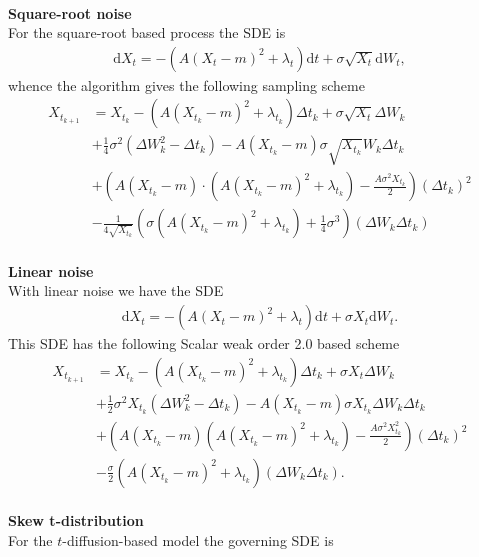 \\
\textbf{Square-root noise}\\
For the square-root based process the SDE is
\begin{align}
    \mathrm{d}X_t = -\left(A(X_t - m)^2 + \lambda_t\right)\mathrm{d}t + \sigma \sqrt{X_t}\mathrm{d}W_t,
\end{align}
whence the algorithm gives the following sampling scheme 
\begin{align}
    X_{t_{k + 1}} &= X_{t_k} - \left(A(X_{t_k} - m)^2 + \lambda_{t_k}\right) \Delta t_k + \sigma \sqrt{X_t} \Delta W_{k}\nonumber\\ &+ \frac{1}{4}\sigma^2 \left(\Delta W_k^2 - \Delta t_k\right)     - A\left(X_{t_k} - m\right)\sigma \sqrt{X_{t_k}} W_k \Delta t_k
    \nonumber\\
     &+ \left(A\left(X_{t_k} - m\right)\cdot \left(A\left(X_{t_k} - m\right)^2 + \lambda_{t_k}\right) - \frac{A\sigma^2 X_{t_k}}{2}\right)(\Delta t_k)^2 \nonumber\\
    &- \frac{1}{4\sqrt{X_{t_k}}}\left(\sigma\left(A\left(X_{t_k} - m\right)^2 + \lambda_{t_k}\right) + \frac{1}{4}\sigma^3\right) \left(\Delta W_k \Delta t_k\right)
\end{align}
\\
\textbf{Linear noise}\\
With linear noise we have the SDE
\begin{align}
    \mathrm{d}X_t = -\left(A(X_t - m)^2 + \lambda_t\right)\mathrm{d}t + \sigma X_t\mathrm{d}W_t.
\end{align}
This SDE has the following Scalar weak order 2.0 based scheme
\begin{align}
    X_{t_{k + 1}} &= X_{t_k} - \left(A(X_{t_k} - m)^2 + \lambda_{t_k}\right) \Delta t_k + \sigma X_t \Delta W_{k} \nonumber \\ &
    + \frac{1}{2}\sigma^2 X_{t_k}\left(\Delta W_{k}^2 - \Delta t_k\right) -A(X_{t_k} - m)\sigma X_{t_k} \Delta W_k\Delta t_k \nonumber\\
    & + \left(A\left(X_{t_k} - m\right)\left(A\left(X_{t_k} - m\right)^2 + \lambda_{t_k}\right) - \frac{A\sigma^2X_{t_k}^2}{2}\right)(\Delta t_k)^2 \nonumber \\
    &- \frac{\sigma}{2}\left(A\left(X_{t_k} - m\right)^2 + \lambda_{t_k}\right)\left(\Delta W_{k}\Delta t_k\right).
\end{align}
\\
\textbf{Skew t-distribution}\\
For the $t$-diffusion-based model the governing SDE is
